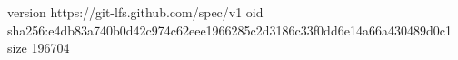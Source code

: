 version https://git-lfs.github.com/spec/v1
oid sha256:e4db83a740b0d42c974c62eee1966285c2d3186c33f0dd6e14a66a430489d0c1
size 196704
